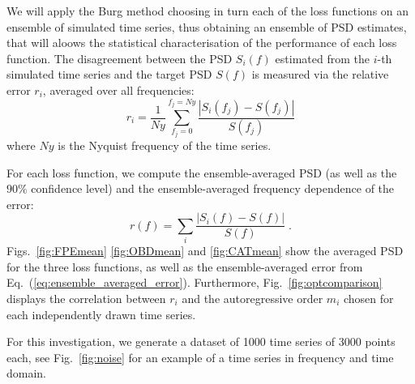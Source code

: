 \documentclass[twocolumn,showpacs,preprintnumbers,nofootinbib,prd,
superscriptaddress,10pt]{revtex4-1}
\begin{document}
We will apply the Burg method choosing in turn each of the loss functions on an ensemble of simulated time series, 
thus obtaining an ensemble of PSD estimates, that will aloows the statistical characterisation of the performance of each loss function.
The disagreement between the PSD $S_i(f)$ estimated from the $i$-th simulated time series and the target PSD $S(f)$ is measured via 
the relative error $r_i$, averaged over all frequencies:
\begin{equation}\label{eq:freq_error}
r_i = \frac{1}{Ny}\sum_{f_j=0}^{f_j = Ny} \frac{|S_i(f_j) - S(f_j)|}{S(f_j)}
\end{equation}
where $Ny$ is the Nyquist frequency of the time series.

For each loss function, we compute the ensemble-averaged PSD (as well as the $90\%$ confidence level) and the ensemble-averaged frequency dependence of the error:
\begin{equation}\label{eq:ensemble_averaged_error}
	r(f) = \sum_i \frac{|S_i(f) - S(f)|}{S(f)} \;.
\end{equation}
Figs.~\ref{fig:FPEmean} \ref{fig:OBDmean} and \ref{fig:CATmean} show the averaged PSD for the three loss functions, 
as well as the ensemble-averaged error from Eq.~(\ref{eq:ensemble_averaged_error}).
Furthermore, Fig.~\ref{fig:optcomparison} displays the correlation between $r_i$ and the autoregressive order $m_i$ chosen for each independently drawn time series.

For this investigation, we generate a dataset of 1000 time series of 3000 points each, see Fig.~\ref{fig:noise} for an example of a time series in frequency and time domain.
\end{document}
